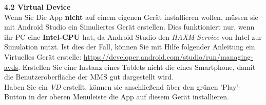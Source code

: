 \begin{itemize}
		\subitem \textbf{4.2 Virtual Device}\\
			Wenn Sie Die App \textbf{nicht} auf einem eigenen Gerät installieren wollen, müssen sie mit Android Studio ein Simuliertes Gerät erstellen. Dies funktioniert nur, wenn ihr PC eine \textbf{Intel-CPU} hat, da Android Studio den \textit{HAXM-Service} von Intel zur Simulation nutzt. Ist dies der Fall, können Sie mit Hilfe folgender Anleitung ein Virtuelles Gerät erstelle: \url{https://developer.android.com/studio/run/managing-avds}. Erstellen Sie eine Instanz eines Tablets nicht die eines Smartphone, damit die Benutzeroberfläche der MMS gut dargestellt wird. \\
			Haben Sie ein \textit{VD} erstellt, können sie anschließend über den grünen 'Play'-Button in der oberen Menuleiste die App auf diesem Gerät installieren. 
\end{itemize}


